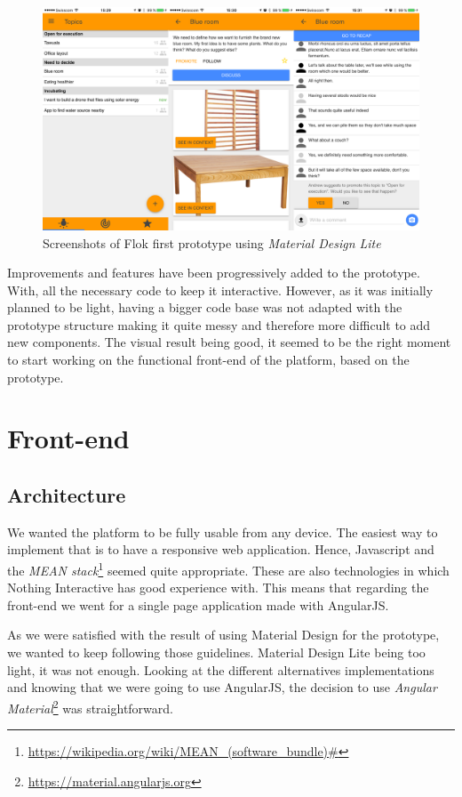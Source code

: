 \documentclass[a4paper,12pt,twoside]{article}
\begin{document}
\begin{figure}[!htb]
    \centering
    \includegraphics[width=\textwidth]{images/firstPrototypeScreenshots.png}
    \caption{Screenshots of Flok first prototype using \emph{Material Design Lite}}
    \label{fig.firstPrototypeScreenshots}
\end{figure}

Improvements and features have been progressively added to the prototype.
With, all the necessary code to keep it interactive.
However, as it was initially planned to be light, having a bigger code base was not adapted with the prototype structure making it quite messy and therefore more difficult to add new components.
The visual result being good, it seemed to be the right moment to start working on the functional front-end of the platform, based on the prototype.

\section{Front-end}
\subsection{Architecture}
\label{sec.architecture}
We wanted the platform to be fully usable from any device.
The easiest way to implement that is to have a responsive web application.
Hence, Javascript and the \emph{MEAN stack}\footnote{\url{https://wikipedia.org/wiki/MEAN_(software_bundle)#}} seemed quite appropriate.
These are also technologies in which Nothing Interactive has good experience with.
This means that regarding the front-end we went for a single page application made with AngularJS.

As we were satisfied with the result of using Material Design for the prototype, we wanted to keep following those guidelines.
Material Design Lite being too light, it was not enough.
Looking at the different alternatives implementations and knowing that we were going to use AngularJS, the decision to use \emph{Angular Material}\footnote{\url{https://material.angularjs.org}} was straightforward.
\end{document}
